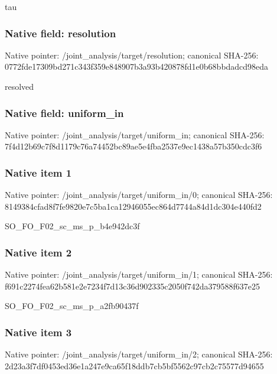 \documentclass[10pt,a4paper]{article}
\begin{document}
\begingroup\raggedright\sloppy tau\par\endgroup

\subsubsection{Native field: resolution}
Native pointer: /joint\_\allowbreak{}analysis/target/resolution; canonical SHA-256: 0772fde17309bd271c343f359e848907b3a93b420878fd1e0b68bbdadcd98eda

\begingroup\raggedright\sloppy resolved\par\endgroup

\subsubsection{Native field: uniform\_\allowbreak{}in}
Native pointer: /joint\_\allowbreak{}analysis/target/uniform\_\allowbreak{}in; canonical SHA-256: 7f4d12b69c7f8d1179c76a74452bc89ae5e4fba2537e9ec1438a57b350cdc3f6

\subsubsection{Native item 1}
Native pointer: /joint\_\allowbreak{}analysis/target/uniform\_\allowbreak{}in/0; canonical SHA-256: 8149384cfad8f7fe9820e7c5ba1ca12946055ec864d7744a84d1dc304e440fd2

\begingroup\raggedright\sloppy SO\_\allowbreak{}FO\_\allowbreak{}F02\_\allowbreak{}sc\_\allowbreak{}ms\_\allowbreak{}p\_\allowbreak{}b4e942dc3f\par\endgroup

\subsubsection{Native item 2}
Native pointer: /joint\_\allowbreak{}analysis/target/uniform\_\allowbreak{}in/1; canonical SHA-256: f691c2274fea62b581e2e7234f7d13c36d902335c2050f742da379588f637e25

\begingroup\raggedright\sloppy SO\_\allowbreak{}FO\_\allowbreak{}F02\_\allowbreak{}sc\_\allowbreak{}ms\_\allowbreak{}p\_\allowbreak{}a2fb90437f\par\endgroup

\subsubsection{Native item 3}
Native pointer: /joint\_\allowbreak{}analysis/target/uniform\_\allowbreak{}in/2; canonical SHA-256: 2d23a3f7df0453ed36e1a247e9ca65f18ddb7cb5bf5562c97cb2c75577d94655
\end{document}
